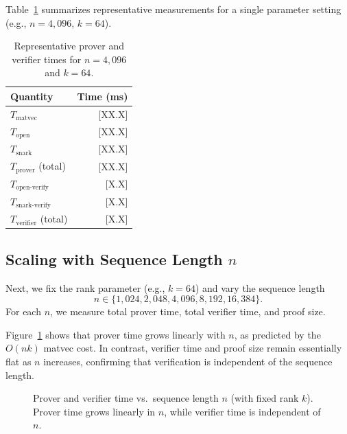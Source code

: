 \documentclass[11pt]{article}
\begin{document}
Table~\ref{tab:micro} summarizes representative measurements for a
single parameter setting (e.g., $n = 4{,}096$, $k = 64$).

\begin{table}[t]
  \centering
  \begin{tabular}{l r}
    \toprule
    Quantity & Time (ms) \\
    \midrule
    $T_{\mathrm{matvec}}$ & [XX.X] \\
    $T_{\mathrm{open}}$ & [XX.X] \\
    $T_{\mathrm{snark}}$ & [XX.X] \\
    \midrule
    $T_{\mathrm{prover}}$ (total) & [XX.X] \\
    \midrule
    $T_{\mathrm{open\text{-}verify}}$ & [X.X] \\
    $T_{\mathrm{snark\text{-}verify}}$ & [X.X] \\
    \midrule
    $T_{\mathrm{verifier}}$ (total) & [X.X] \\
    \bottomrule
  \end{tabular}
  \caption{Representative prover and verifier times for
  $n = 4{,}096$ and $k = 64$.}
  \label{tab:micro}
\end{table}

\subsection{Scaling with Sequence Length $n$}
\label{subsec:scaling-n}

Next, we fix the rank parameter (e.g., $k = 64$) and vary the sequence
length
\[
  n \in \{1{,}024, 2{,}048, 4{,}096, 8{,}192, 16{,}384\}.
\]
For each $n$, we measure total prover time, total verifier time, and
proof size.

Figure~\ref{fig:scaling-n} shows that prover time grows linearly with
$n$, as predicted by the $O(nk)$ matvec cost.
In contrast, verifier time and proof size remain essentially flat as $n$
increases, confirming that verification is independent of the sequence
length.

\begin{figure}[t]
  \centering
  \caption{Prover and verifier time vs.\ sequence length $n$
  (with fixed rank $k$).
  Prover time grows linearly in $n$, while verifier time is independent
  of $n$.}
  \label{fig:scaling-n}
\end{figure}
\end{document}
